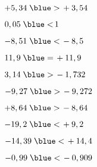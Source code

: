    \ \\ [-7mm]
   {\baselineskip=7mm
   \begin{colenumerate}{2}
      \item $+5,34 \; {\blue >} \, +3,54$
      \item $0,05 \; {\blue <} \, 1$
      \item $-8,51 \; {\blue <} \, -8,5$
      \item $11,9 \; {\blue =} \, +11,9$
      \item $3,14 \; {\blue >} \, -1,732$
      \item $-9,27 \; {\blue >} \, -9,272$
      \item $+8,64 \; {\blue >} \, -8,64$
      \item $-19,2 \; {\blue <} \, +9,2$
      \item $-14,39 \; {\blue <} \, +14,4$
      \item $-0,99 \; {\blue <} \, -0,909$
   \end{colenumerate}}
